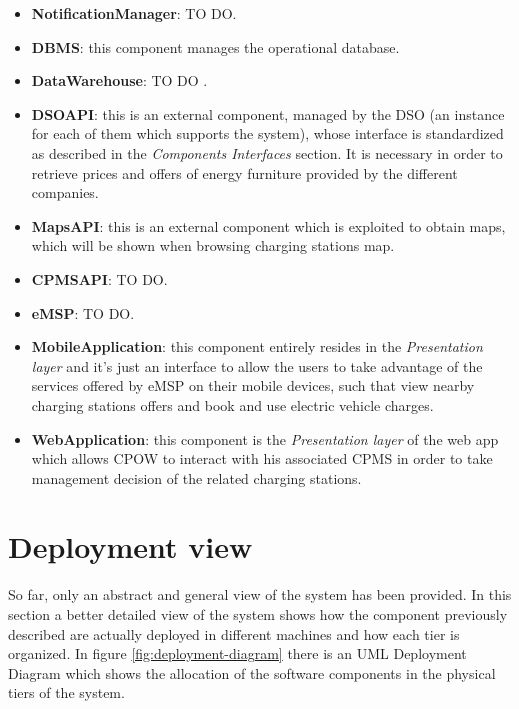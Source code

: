 \documentclass[a4paper]{report}
\begin{document}
\begin{itemize}
\item \textbf{NotificationManager}: TO DO.

\item \textbf{DBMS}: this component manages the operational database.

\item \textbf{DataWarehouse}: TO DO .

\item \textbf{DSOAPI}: this is an external component, managed by the DSO (an instance for each of them which supports the system), whose interface is standardized as described in the \textit{Components Interfaces} section. It is necessary in order to retrieve prices and offers of energy furniture provided by the different companies.

\item \textbf{MapsAPI}: this is an external component which is exploited to obtain maps, which will be shown when browsing charging stations map.

\item \textbf{CPMSAPI}: TO DO.

\item \textbf{eMSP}: TO DO.

\item \textbf{MobileApplication}: this component entirely resides in the \textit{Presentation layer} and it's just an interface to allow the users to take advantage of the services offered by eMSP on their mobile devices, such that view nearby charging stations offers and book and use electric vehicle charges.

\item \textbf{WebApplication}: this component is the \textit{Presentation layer} of the web app which allows CPOW to interact with his associated CPMS in order to take management decision of the related charging stations.
\end{itemize}

\section{Deployment view}

So far, only an abstract and general view of the system has been provided. In this section a better detailed view of the system shows how the component previously described are actually deployed in different machines and how each tier is organized.
In figure \ref{fig:deployment-diagram} there is an UML Deployment Diagram which shows the allocation of the software components in the physical tiers of the system. 
\end{document}
